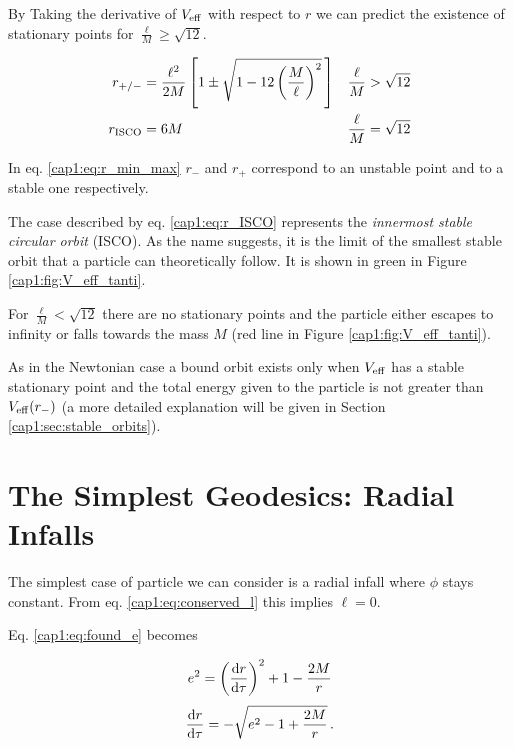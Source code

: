 By Taking the derivative of $V_{\rm eff}$ with respect to $r$ we can predict the
existence of stationary points for $\frac{\ell}{M} \geq \sqrt{12}$.

\begin{subequations}
\begin{align}
    r_{+ / -} &= \frac{\ell^2}{2 M} \left[1 \pm
    \sqrt{1 - 12 \left( \frac{M}{\ell} \right)^2} \, \right]
    &&\frac{\ell}{M} > \sqrt{12} \label{cap1:eq:r_min_max} \\
    r_{\rm ISCO} &= 6 M
    &&\frac{\ell}{M} = \sqrt{12} \label{cap1:eq:r_ISCO}
\end{align}
\label{cap1:eq:stationary_r}
\end{subequations}

In eq. \ref{cap1:eq:r_min_max} $r_-$ and $r_+$ correspond
to an unstable point and to a stable one respectively.

The case described by eq. \ref{cap1:eq:r_ISCO} represents the
\textit{innermost stable circular orbit} (ISCO).
As the name suggests, it is the limit of the smallest stable orbit that a
particle can theoretically follow.
It is shown in green in Figure \ref{cap1:fig:V_eff_tanti}.

For $\frac{\ell}{M} < \sqrt{12}$ there are no stationary points and the particle
either escapes to infinity or falls towards the mass $M$ (red line in Figure
\ref{cap1:fig:V_eff_tanti}).

As in the Newtonian case a bound orbit exists only when $V_{\rm eff}$ has a
stable stationary point and the total energy given to the particle is not
greater than $V_{\rm eff}(r_-)$ (a more detailed explanation will be given in
Section \ref{cap1:sec:stable_orbits}).


\section{The Simplest Geodesics: Radial Infalls}

The simplest case of particle we can consider is a radial infall where $\phi$
stays constant.
From eq. \ref{cap1:eq:conserved_l} this implies $\ell = 0$.

Eq. \ref{cap1:eq:found_e} becomes


\begin{equation*}
    e^2 = \left(\dv{r}{\tau}\right)^2 + 1 - \frac{2M}{r}
\end{equation*}
\begin{equation}
    \dv{r}{\tau} = - \sqrt{e^2 - 1 + \frac{2 M}{r}} \, .
    \label{cap1:eq:radial_infall_ODE_1}
\end{equation}

